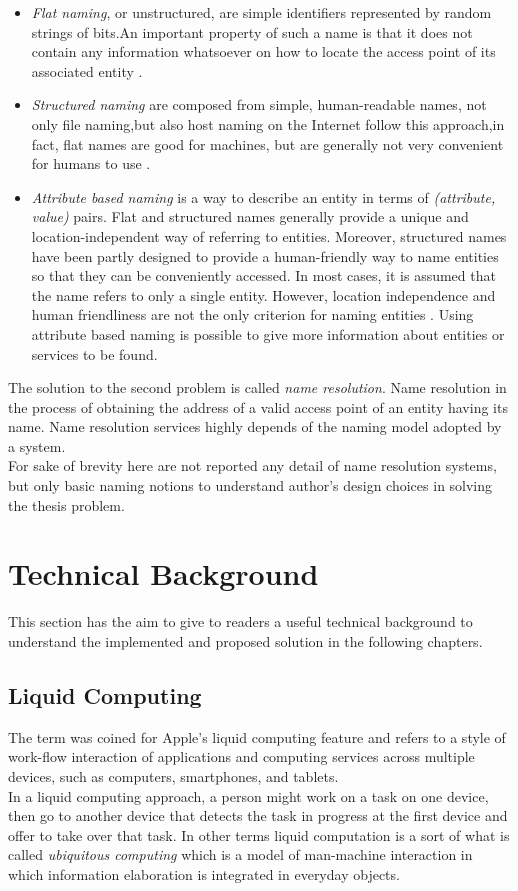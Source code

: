\begin{itemize}
	\item \textit{Flat naming}, or unstructured, are simple identifiers represented by random strings of bits.An important property of such a name is that it does not contain any information whatsoever on how to locate the	access point of its associated entity \cite{tanenbaum2010distributed}.
	\item \textit{Structured naming} are composed from simple, human-readable names, not only file naming,but also host naming on the Internet follow this approach,in fact, flat names are good for machines, but are generally not very convenient for humans to use \cite{tanenbaum2010distributed}.
	\item \textit{Attribute based naming} is a way to describe an entity in terms of \textit{(attribute, value)}
	pairs. Flat and structured names generally provide a unique and location-independent
	way of referring to entities. Moreover, structured names have been partly
	designed to provide a human-friendly way to name entities so that they can be
	conveniently accessed. In most cases, it is assumed that the name refers to only a
	single entity. However, location independence and human friendliness are not the
	only criterion for naming entities \cite{tanenbaum2010distributed}. Using attribute based naming is possible to give more information about entities or services to be found.
\end{itemize}
The solution to the second problem is called \textit{name resolution}. Name resolution in the process of obtaining the address of a valid access point of an entity having its name. Name resolution services highly depends of the naming model adopted by a system.\\
For sake of brevity here are not reported any detail of name resolution systems, but only basic naming notions to understand author's design choices in solving the thesis problem. 


\section{Technical Background}\label{techback}
This section has the aim to give to readers a useful technical background to understand the implemented and proposed solution in the following chapters.
\subsection{Liquid Computing}\label{liquid computing}
The term was coined for Apple's liquid computing feature and refers to a style of work-flow interaction of applications and computing services across multiple devices, such as computers, smartphones, and tablets.\\
In a liquid computing approach, a person might work on a task on one device, then go to another device that detects the task in progress at the first device and offer to take over that task.
In other terms liquid computation is a sort of what is called \textit{ubiquitous computing} which is a model of man-machine interaction in which information elaboration is integrated in everyday objects.
